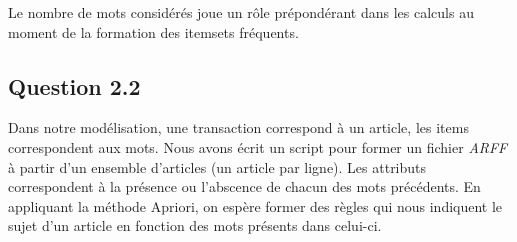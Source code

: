 \documentclass[a4paper,12pt]{article}
\begin{document}
Le nombre de mots considérés joue un rôle prépondérant dans les calculs au moment de la formation des itemsets fréquents.


\subsection*{Question 2.2}

Dans notre modélisation, une transaction correspond à un article, les items correspondent aux mots.
Nous avons écrit un script pour former un fichier \textit{ARFF} à partir d'un ensemble d'articles (un article par ligne).
Les attributs correspondent à la présence ou l'abscence de chacun des mots précédents.
En appliquant la méthode Apriori, on espère former des règles qui nous indiquent le sujet d'un article en fonction des mots présents dans celui-ci.
\end{document}
